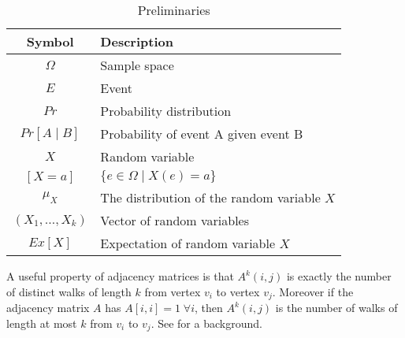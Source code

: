 \begin{table}[h]
\centering
\begin{tabular}{cl}
\toprule
\textbf{Symbol} & \textbf{Description} \\
\midrule
$\Omega$ & Sample space \\
$E$ & Event \\
$Pr$ & Probability distribution \\
$Pr[A \mid B]$ & Probability of event A given event B \\
$X$ & Random variable \\
$[X=a]$ & $\{e \in \Omega \mid X(e) = a\}$ \\
$\mu_X$ & The distribution of the random variable $X$ \\
$(X_1, \dots, X_k)$ & Vector of random variables \\
$Ex[X]$ & Expectation of random variable $X$ \\
\bottomrule
\end{tabular}
\caption{Preliminaries}
\label{table:1}
\end{table}

A useful property of adjacency matrices is that $A^k(i,j)$ is exactly the number of distinct walks of length $k$ from vertex $v_i$ to vertex $v_j$. Moreover if the adjacency matrix $A$ has $A[i,i] = 1 \; \forall i$, then $A^k(i,j)$ is the number of walks of length at most $k$ from $v_i$ to $v_j$. See \cite{discreteHandbook} for a background.